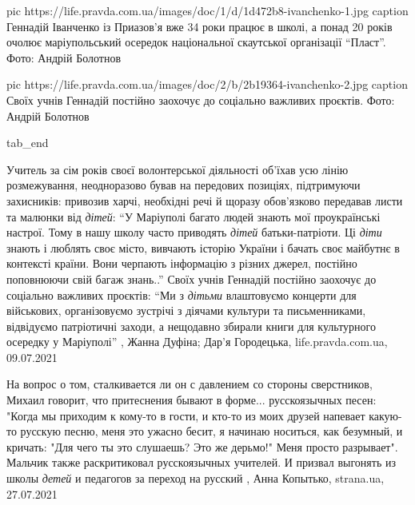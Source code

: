 		 pic https://life.pravda.com.ua/images/doc/1/d/1d472b8-ivanchenko-1.jpg
     caption Геннадій Іванченко із Приазов’я вже 34 роки працює в школі, а понад 20 років очолює маріупольський осередок національної скаутської організації \enquote{Пласт}. Фото: Андрій Болотнов

     pic https://life.pravda.com.ua/images/doc/2/b/2b19364-ivanchenko-2.jpg
		 caption Своїх учнів Геннадій постійно заохочує до соціально важливих проєктів. Фото: Андрій Болотнов

  tab_end
\fi

Учитель за сім років своєї волонтерської діяльності об’їхав усю лінію
розмежування,  неодноразово бував на передових позиціях, підтримуючи
захисників: привозив харчі, необхідні речі й щоразу обов’язково передавав листи
та малюнки від \emph{дітей}: 
\enquote{У Маріуполі багато людей знають мої проукраїнські настрої. Тому в нашу
школу часто приводять \emph{дітей} батьки-патріоти.  Ці \emph{діти} знають і
люблять своє місто, вивчають історію України і бачать своє майбутнє в контексті
країни. Вони черпають інформацію з різних джерел, постійно поповнюючи свій
багаж знань..} Своїх учнів Геннадій постійно заохочує до соціально важливих
проєктів: \enquote{Ми з \emph{дітьми} влаштовуємо концерти для військових,
організовуємо зустрічі з діячами культури та письменниками, відвідуємо
патріотичні заходи, а нещодавно збирали книги для культурного осередку у
Маріуполі} 
, 
Жанна Дуфіна; Дар'я Городецька, life.pravda.com.ua, 09.07.2021

На вопрос о том, сталкивается ли он с давлением со стороны сверстников, Михаил
говорит, что притеснения бывают в форме... русскоязычных песен: "Когда мы
приходим к кому-то в гости, и кто-то из моих друзей напевает какую-то русскую
песню, меня это ужасно бесит, я начинаю носиться, как безумный, и кричать: "Для
чего ты это слушаешь? Это же дерьмо!" Меня просто разрывает".  Мальчик также
раскритиковал русскоязычных учителей. И призвал выгонять из школы \emph{детей}
и педагогов за переход на русский
, 
Анна Копытько, strana.ua, 27.07.2021
